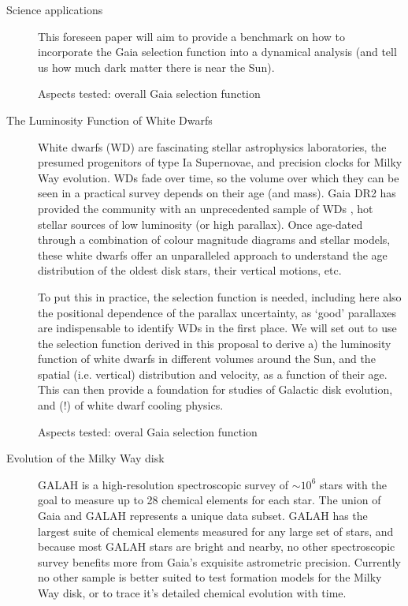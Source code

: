 \begin{workpackage}{Science applications}
\begin{wpobjectives}
\begin{description}
{        This foreseen paper will aim  to provide a benchmark on how to incorporate the Gaia selection function into a dynamical analysis (and tell us how much dark matter there is near the Sun).
        
        \textsf{Aspects tested: overall Gaia selection function}    
    }
      
    \item[The Luminosity Function of White Dwarfs]{
        White dwarfs (WD) are fascinating stellar astrophysics laboratories, the presumed progenitors of type Ia Supernovae, and precision clocks for Milky Way evolution. WDs fade over time, so the volume over which they can be seen in a practical survey depends on their age (and mass). Gaia DR2 has provided the community with an unprecedented sample of WDs \citep{WD_DR2}, hot stellar sources of low luminosity (or high parallax). Once age-dated through a combination of colour magnitude diagrams and stellar models, these white dwarfs offer an unparalleled approach to understand the age distribution of the oldest disk stars, their vertical motions, etc.
      
        To put this in practice, the selection function is needed, including here also the positional dependence of the parallax uncertainty, as `good' parallaxes are indispensable to identify WDs in the first place. We will set out to use the selection function derived in this proposal to derive a) the luminosity function of white dwarfs in different volumes around the Sun, and the spatial (i.e. vertical) distribution and velocity, as a function of their age. This can then provide a foundation for studies of Galactic disk evolution, and (!) of white dwarf cooling physics.
        
        \textsf{Aspects tested: overal Gaia selection function}
    }
      
     \item[Evolution of the Milky Way disk]
        {GALAH is a high-resolution spectroscopic survey of $\sim10^6$ stars with the goal to measure up to 28 chemical elements for each star. The union of Gaia and GALAH represents a unique data subset. GALAH has the largest suite of chemical elements measured for any large set of stars, and because most GALAH stars are bright and nearby, no other spectroscopic survey benefits more from Gaia's exquisite astrometric precision. Currently no other sample is better suited to test formation models for the Milky Way disk, or to trace it's detailed chemical evolution with time.
      
}
\end{description}
\end{wpobjectives}
\end{workpackage}
